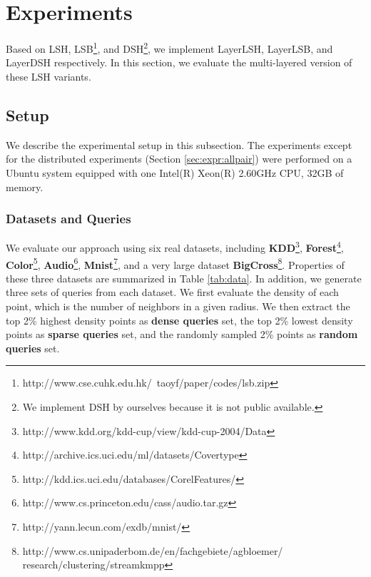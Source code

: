 \section{Experiments}
\label{sec:expr}

Based on LSH, LSB\footnote{http://www.cse.cuhk.edu.hk/~taoyf/paper/codes/lsb.zip}, and DSH\footnote{We implement DSH by ourselves because it is not public available.}, we implement LayerLSH, LayerLSB, and LayerDSH respectively. In this section, we evaluate the multi-layered version of these LSH variants.

\subsection{Setup}
We describe the experimental setup in this subsection. The experiments except for the distributed experiments (Section \ref{sec:expr:allpair}) were performed on a Ubuntu system equipped with one Intel(R) Xeon(R) 2.60GHz CPU, 32GB of memory.

\subsubsection{Datasets and Queries}

We evaluate our approach using six real datasets, including \textbf{KDD}\footnote{http://www.kdd.org/kdd-cup/view/kdd-cup-2004/Data}, \textbf{Forest}\footnote{http://archive.ics.uci.edu/ml/datasets/Covertype}, \textbf{Color}\footnote{http://kdd.ics.uci.edu/databases/CorelFeatures/}, \textbf{Audio}\footnote{http://www.cs.princeton.edu/cass/audio.tar.gz}, \textbf{Mnist}\footnote{http://yann.lecun.com/exdb/mnist/}, and a very large dataset \textbf{BigCross}\footnote{http://www.cs.unipaderbom.de/en/fachgebiete/agbloemer/\\
research/clustering/streamkmpp}. Properties of these three datasets are summarized in Table \ref{tab:data}. In addition, we generate three sets of queries from each dataset. We first evaluate the density of each point, which is the number of neighbors in a given radius. We then extract the top 2\% highest density points as \textbf{dense queries} set, the top 2\% lowest density points as \textbf{sparse queries} set, and the randomly sampled 2\% points as \textbf{random queries} set.



